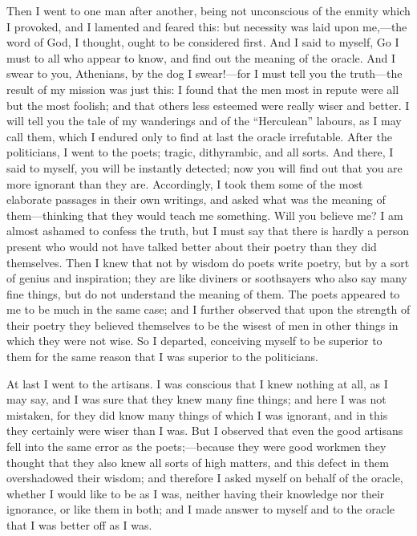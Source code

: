 \documentclass[11pt,letter]{article}
\begin{document}
\par  Then I went to one man after another, being not unconscious of the enmity which I provoked, and I lamented and feared this: but necessity was laid upon me,—the word of God, I thought, ought to be considered first. And I said to myself, Go I must to all who appear to know, and find out the meaning of the oracle. And I swear to you, Athenians, by the dog I swear!—for I must tell you the truth—the result of my mission was just this: I found that the men most in repute were all but the most foolish; and that others less esteemed were really wiser and better. I will tell you the tale of my wanderings and of the “Herculean” labours, as I may call them, which I endured only to find at last the oracle irrefutable. After the politicians, I went to the poets; tragic, dithyrambic, and all sorts. And there, I said to myself, you will be instantly detected; now you will find out that you are more ignorant than they are. Accordingly, I took them some of the most elaborate passages in their own writings, and asked what was the meaning of them—thinking that they would teach me something. Will you believe me? I am almost ashamed to confess the truth, but I must say that there is hardly a person present who would not have talked better about their poetry than they did themselves. Then I knew that not by wisdom do poets write poetry, but by a sort of genius and inspiration; they are like diviners or soothsayers who also say many fine things, but do not understand the meaning of them. The poets appeared to me to be much in the same case; and I further observed that upon the strength of their poetry they believed themselves to be the wisest of men in other things in which they were not wise. So I departed, conceiving myself to be superior to them for the same reason that I was superior to the politicians.

\par  At last I went to the artisans. I was conscious that I knew nothing at all, as I may say, and I was sure that they knew many fine things; and here I was not mistaken, for they did know many things of which I was ignorant, and in this they certainly were wiser than I was. But I observed that even the good artisans fell into the same error as the poets;—because they were good workmen they thought that they also knew all sorts of high matters, and this defect in them overshadowed their wisdom; and therefore I asked myself on behalf of the oracle, whether I would like to be as I was, neither having their knowledge nor their ignorance, or like them in both; and I made answer to myself and to the oracle that I was better off as I was.
\end{document}
